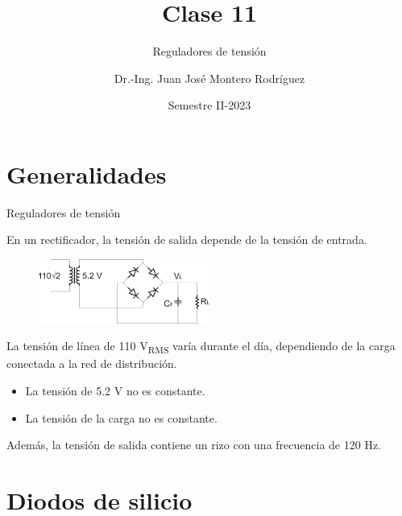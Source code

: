 \documentclass[t,aspectratio=169]{beamer}
\title{Clase 11}
\subtitle{Reguladores de tensión}
\author{Dr.-Ing. Juan José Montero Rodríguez}
\institute{Escuela de Ingeniería Electrónica}
\date{Semestre II-2023}
\begin{document}
\begin{frame}{}
\maketitle
\end{frame}

\section{Generalidades}

\begin{frame}{Reguladores de tensión}

En un rectificador, la tensión de salida depende de la tensión de entrada.

\begin{figure}
    \centering
    \includegraphics[width=0.5\textwidth]{figures/rectifier.png}
\end{figure}

La tensión de línea de 110 V\textsubscript{RMS} varía durante el día, dependiendo de la carga conectada a la red de distribución.

    \begin{itemize}
        \item La tensión de 5.2 V no es constante.
        \item La tensión de la carga no es constante.
    \end{itemize}

\vspace{5mm}
Además, la tensión de salida contiene un rizo con una frecuencia de 120 Hz.

\end{frame}

\section{Diodos de silicio}
\end{document}
